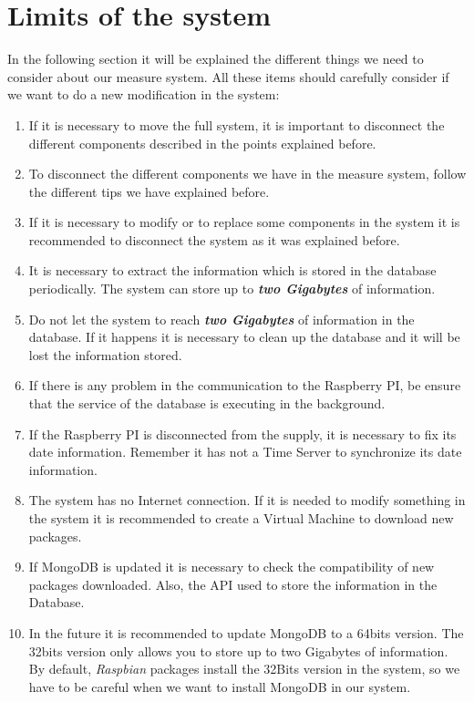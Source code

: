 \section{Limits of the system}

In the following section it will be explained the different things we need to consider about our measure system. All these items should carefully consider if we want to do a new modification in the system:

\begin{enumerate}

\item If it is necessary to move the full system, it is important to disconnect the different components described in the points explained before.

\item To disconnect the different components we have in the measure system, follow the different tips we have explained before.

\item If it is necessary to modify or to replace some components in the system it is recommended to disconnect the system as it was explained before.

\item It is necessary to extract the information which is stored in the database periodically. The system can store up to \textit{\textbf{two Gigabytes}} of information.

\item Do not let the system to reach \textit{\textbf{two Gigabytes}} of information in the database. If it happens it is necessary to clean up the database and it will be lost the information stored.

\item If there is any problem in the communication to the Raspberry PI, be ensure that the service of the database is executing in the background.

\item If the Raspberry PI is disconnected from the supply, it is necessary to fix its date information. Remember it has not a Time Server to synchronize its date information.

\item The system has no Internet connection. If it is needed to modify something in the system it is recommended to create a Virtual Machine to download new packages.

\item If MongoDB is updated it is necessary to check the compatibility of new packages downloaded. Also, the API used to store the information in the Database.

\item In the future it is recommended to update MongoDB to a 64bits version. The 32bits version only allows you to store up to two Gigabytes of information. By default, \textit{Raspbian} packages install the 32Bits version in the system, so we have to be careful when we want to install MongoDB in our system.

\end{enumerate}

\newpage
\newpage